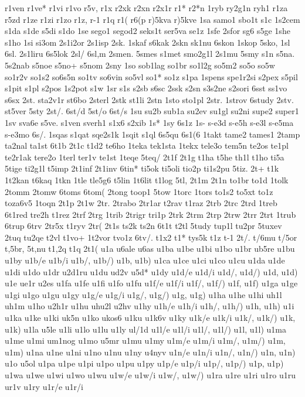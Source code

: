 {{r1ven
r1ve*
r1vi
r1vo
r5v,
r1x
r2xk
r2xn
r2x1r
r1*
r2*n
1ryb
ry2g1n
ryh1
r1za
r5zd
r1ze
r1zi
r1zo
r1z,
r-1
r1q
r1(
r6(p
r)5kva
r)5kve
1sa
samo1
sbo1t
s1c
1s2cem
s1da
s1de
s5di
s1do
1se
sego1
segod2
seks1t
ser5va
se1z
1sfe
2sfor
sg6
s5ge
1she
s1ho
1si
si3om
2s1i2or
2s1isp
2sk.
1skaf
s6kak
2skn
sk1nu
6skon
1skop
5sko,
1sl
6sl.
2s1liru
6s5lok
2sl/
6sl,m
2smen.
5smes
s1met
smo2g1l
2s1mu
5smy
s1n
s5na.
5s2nab
s5noe
s5no+
s5nom
2sny
1so
sob1lag
so1br
so1l2g
so5m2
so5o
so5w
so1r2v
so1s2
so6s5n
so1tv
so6vin
so5vl
so1*
so1z
s1pa
1spens
spe1r2si
s2pex
s5pil
s1pit
s1pl
s2pos
1s2pot
s1w
1sr
s1s
s2sb
s6sc
2ssk
s2sn
s3s2ne
s2sori
6sst
ss1vo
s6sx
2st.
sta2v1r
st6bo
2sterl
2stk
st1li
2stn
1sto
sto1pl
2str.
1strov
6study
2stv.
st5ver
5sty
2st/.
6st/d
5st/o
6st/s
1su
su2b
sub1a
su2ev
su1gl
su2ni
supe2
super1
1sv
sva6e
s5ve.
s1ven
sverh1
s1x6
s2xib
1s*
1sy
6s1z
1s-
s-e3d
s-e5h
s-e3l
s-e5ma
s-e3mo
6s/.
1sqas
s1qat
sqe2s1k
1sqit
s1ql
6s5qu
6s1(6
1takt
tame2
tames1
2tamp
ta2nal
ta1st
6t1b
2t1c
t1d2
te6ho
1teka
tek1sta
1tekx
tele3o
tem5n
te2os
te1pl
te2r1ak
tere2o
1terl
ter1v
te1st
1teqe
5teq/
2t1f
2t1g
t1ha
t5he
th1l
t1ho
ti5a
5tige
ti2g1l
t5imp
2t1inf
2t1inv
6tin*
ti5ok
ti5oli
tio2p
ti1s2pu
5tiz.
2t+
t1k
1t2kan
t6kaq
1tkn
1tle
tle5g6
t5lin
1t6lit
t1log
5tl,
2t1m
2t1n
to1br
to1d
1tolk
2tomm
2tomw
6toms
6tom(
2tong
toop1
5tow
1torc
1tors
to1s2
to5xt
to1z
toza6v5
1toqn
2t1p
2t1w
2tr.
2trabo
2tr1ar
t2rav
t1raz
2trb
2trc
2trd
1treb
6t1red
tre2h
t1rez
2trf
2trg
1trib
2trigr
tri1p
2trk
2trm
2trp
2trw
2trr
2trt
1trub
6trup
6trv
2tr5x
t1ryv
2tr(
2t1s
ts2k
ts2n
6t1t
t2tl
5tudy
tup1l
tu2pr
5tuxev
2tuq
tu2qe
t2vl
t1vo+
1t2vor
tvo1z
6tv/.
t1x2
t1*
tys5k
t1z
t-1
2t/.
t/6mu
t/5or
t,5br,
5t,nu
t1,2q
t1q
2t1(
u1a
u6ale
u6as
u1ba
u1be
u1bi
u1bo
u1br
ub5re
u1bu
u1by
u1b/e
u1b/i
u1b/,
u1b/)
u1b,
u1b)
u1ca
u1ce
u1ci
u1co
u1cu
u1da
u1de
u1di
u1do
u1dr
u2d1ru
u1du
ud2v
u5d*
u1dy
u1d/e
u1d/i
u1d/,
u1d/)
u1d,
u1d)
u1e
ue1r
u2es
u1fa
u1fe
u1fi
u1fo
u1fu
u1f/e
u1f/i
u1f/,
u1f/)
u1f,
u1f)
u1ga
u1ge
u1gi
u1go
u1gu
u1gy
u1g/e
u1g/i
u1g/,
u1g/)
u1g,
u1g)
u1ha
u1he
u1hi
uh1l
uh1m
u1ho
u2h1r
u1hu
uhu2l
u2hv
u1hy
u1h/e
u1h/i
u1h/,
u1h/)
u1h,
u1h)
u1i
u1ka
u1ke
u1ki
uk5n
u1ko
ukos6
u1ku
u1k6v
u1ky
u1k/e
u1k/i
u1k/,
u1k/)
u1k,
u1k)
u1la
u5le
u1li
u1lo
u1lu
u1ly
ul/1d
u1l/e
u1l/i
u1l/,
u1l/)
u1l,
u1l)
u1ma
u1me
u1mi
um1nog
u1mo
u5mr
u1mu
u1my
u1m/e
u1m/i
u1m/,
u1m/)
u1m,
u1m)
u1na
u1ne
u1ni
u1no
u1nu
u1ny
u4nyv
u1n/e
u1n/i
u1n/,
u1n/)
u1n,
u1n)
u1o
u5ol
u1pa
u1pe
u1pi
u1po
u1pu
u1py
u1p/e
u1p/i
u1p/,
u1p/)
u1p,
u1p)
u1wa
u1we
u1wi
u1wo
u1wu
u1w/e
u1w/i
u1w/,
u1w/)
u1ra
u1re
u1ri
u1ro
u1ru
ur1v
u1ry
u1r/e
u1r/i
}}
